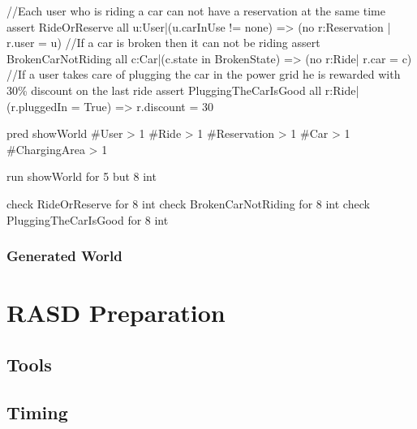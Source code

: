 \documentclass[11pt,a4paper]{report}
\begin{document}
\begin{alloyCode}
//Each user who is riding a car can not have a reservation at the same time
assert RideOrReserve{
	all u:User|(u.carInUse != none) => (no r:Reservation | r.user = u)
}
//If a car is broken then it can not be riding
assert BrokenCarNotRiding{
	all c:Car|(c.state in BrokenState) => (no r:Ride| r.car = c)
}
//If a user takes care of plugging the car in the power grid he is rewarded with 30\% discount on the last ride
assert PluggingTheCarIsGood{
	all r:Ride|(r.pluggedIn = True) => r.discount = 30
}

pred showWorld{
	#User > 1
	#Ride > 1 
	#Reservation > 1
	#Car > 1 
	#ChargingArea > 1
}

run showWorld for 5 but 8 int

check RideOrReserve for 8 int
check BrokenCarNotRiding for 8 int
check PluggingTheCarIsGood for 8 int
\end{alloyCode}
\vspace*{0.3cm}
\subsection{Generated World}

\chapter{RASD Preparation}
\section{Tools}
\section{Timing}
\end{document}
